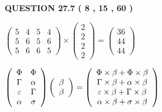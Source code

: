 \documentclass[12pt]{article}
\begin{document}
  
\vspace{0.2in}
  
{\textbf{\Large{QUESTION
27.7 
 (           8 ,          15 ,          60 )
}}}
  
  
 
 
\noindent{}

 
$\left( \begin{array}{ccccccccccccccc}
           5  & 
           4  & 
           5  & 
           4  \\ 
           5  & 
           6  & 
           5  & 
           6  \\ 
           5  & 
           6  & 
           6  & 
           5
\end{array}\right) \times
\left( \begin{array}{c}
           2  \\ 
           2  \\ 
           2  \\ 
           2
\end{array}\right)  =
\left( \begin{array}{c}
          36  \\ 
          44  \\ 
          44
\end{array}\right)  $
 
$  %
 \left( \begin{array}
 {
 c
 c
 }
 \Phi & 
 \Phi \\ 
 \Gamma & 
 \alpha \\ 
 \varepsilon & 
 \Gamma \\ 
 \alpha & 
 \sigma
 \end{array} \right)
 \left( \begin{array}
 {
 c
 }
 \beta \\ 
 \beta
 \end{array} \right)
=
 \left( \begin{array}
 {
 c
 }
  \Phi \times  \beta +  \Phi \times  \beta \\ 
  \Gamma \times  \beta +  \alpha \times  \beta \\ 
  \varepsilon \times  \beta +  \Gamma \times  \beta \\ 
  \alpha \times  \beta +  \sigma \times  \beta
 \end{array} \right)
$
 
 
 
  
\vspace{0.2in}
  
\end{document}
